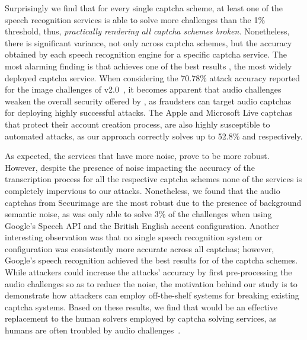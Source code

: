 Surprisingly we find that for every single captcha scheme, at least
one of the speech recognition services is able to solve more challenges than the 1\% threshold, thus, \emph{practically 
rendering all captcha schemes broken.} Nonetheless, there is significant variance, not only across captcha schemes, but
the accuracy obtained by each speech recognition engine for a specific captcha service.
The most alarming finding is that \system achieves one of the best results \re, the most widely deployed captcha service.
When considering the 70.78\% attack accuracy reported for the image challenges of v2.0~\cite{sivakorn:eurosp16},
it becomes apparent that audio challenges weaken the overall security offered by \re, as fraudsters can target 
audio captchas for deploying highly successful attacks. 
The Apple and Microsoft Live captchas that protect their account creation process, are also highly susceptible to 
automated attacks, as our approach correctly solves up to 52.8\% and  respectively.

As expected, the services that have more noise, prove to be more robust.
However, despite the presence of noise impacting the accuracy of the transcription process for all the respective captcha schemes
none of the services is completely impervious to our attacks. Nonetheless, we
found that the audio captchas from Securimage are the most robust due to the presence of background semantic noise,
as \system was only able to solve 3\% of the challenges when using Google's Speech API and the British English accent
configuration. Another interesting observation was that no single speech recognition system or configuration
was consistently more accurate across all captchas; however, Google's speech recognition achieved the best
results for  of the captcha schemes. While attackers could increase the attacks' accuracy
by first pre-processing the audio challenges so as to reduce the noise, the motivation behind our study is to 
demonstrate how attackers can employ off-the-shelf systems for breaking existing captcha systems.
Based on these results, we find that \system would be an effective replacement to the human solvers employed by
captcha solving services, as humans are often troubled by audio challenges~\cite{captchas-are-hard}.


